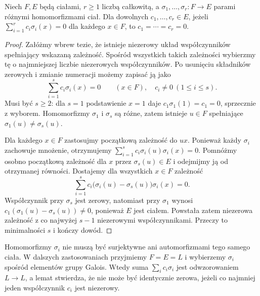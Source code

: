 \begin{lemat}\label{aa:lem:dedekind-independent}
Niech $F,E$ będą ciałami, $r\geq1$ liczbą całkowitą,
a $\sigma_1,\ldots,\sigma_r:F\to E$ parami różnymi homomorfizmami ciał.
Dla dowolnych $c_1,\ldots,c_r\in E$, jeżeli
$\sum_{i=1}^r c_i\sigma_i(x)=0$ dla każdego $x\in F$,
to $c_1=\cdots=c_r=0$.
\end{lemat}
\begin{proof}
Załóżmy wbrew tezie, że istnieje niezerowy układ współczynników
spełniający wskazaną zależność. Spośród wszystkich takich zależności
wybierzmy tę o najmniejszej liczbie niezerowych współczynników.
Po usunięciu składników zerowych i zmianie numeracji możemy zapisać ją jako
\[
\sum_{i=1}^{s}c_i\sigma_i(x)=0\qquad(x\in F),
\quad c_i\neq0\ (1\leq i\leq s).
\]
Musi być $s\geq2$: dla $s=1$ podstawienie $x=1$ daje
$c_1\sigma_1(1)=c_1=0$, sprzecznie z wyborem.
Homomorfizmy $\sigma_1$ i $\sigma_s$ są różne, zatem
istnieje $u\in F$ spełniające $\sigma_1(u)\neq\sigma_s(u)$.

Dla każdego $x\in F$ zastosujmy początkową zależność do $ux$.
Ponieważ każdy $\sigma_i$ zachowuje mnożenie, otrzymujemy
$\sum_{i=1}^{s}c_i\sigma_i(u)\sigma_i(x)=0$.
Pomnóżmy osobno początkową zależność dla $x$ przez
$\sigma_s(u)\in E$ i odejmijmy ją od otrzymanej równości.
Dostajemy dla wszystkich $x\in F$ zależność
\[
\sum_{i=1}^{s}c_i\bigl(\sigma_i(u)-\sigma_s(u)\bigr)\sigma_i(x)=0.
\]
Współczynnik przy $\sigma_s$ jest zerowy, natomiast przy
$\sigma_1$ wynosi $c_1(\sigma_1(u)-\sigma_s(u))\neq0$,
ponieważ $E$ jest ciałem. Powstała zatem niezerowa zależność
z co najwyżej $s-1$ niezerowymi współczynnikami. Przeczy to minimalności
$s$ i kończy dowód.
\end{proof}

\begin{uwaga}
Homomorfizmy $\sigma_i$ nie muszą być surjektywne ani automorfizmami
tego samego ciała. W dalszych zastosowaniach przyjmiemy $F=E=L$
i wybierzemy $\sigma_i$ spośród elementów grupy Galois.
Wtedy suma $\sum_i c_i\sigma_i$ jest odwzorowaniem $L\to L$,
a lemat stwierdza, że nie może być identycznie zerowa,
jeżeli co najmniej jeden współczynnik $c_i$ jest niezerowy.
\end{uwaga}


